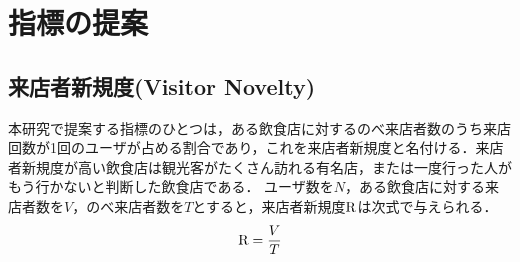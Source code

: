 \chapter{指標の提案}
\label{chap:proposal}





\section{来店者新規度(Visitor Novelty)}

本研究で提案する指標のひとつは，ある飲食店に対するのべ来店者数のうち来店回数が1回のユーザが占める割合であり，これを来店者新規度と名付ける．来店者新規度が高い飲食店は観光客がたくさん訪れる有名店，または一度行った人がもう行かないと判断した飲食店である．
ユーザ数を$N$，ある飲食店に対する来店者数を$V$，のべ来店者数を$T$とすると，来店者新規度$\rm R$は次式で与えられる．
\begin{equation}
	{\rm R} = \frac{V}{T}
\end{equation}



